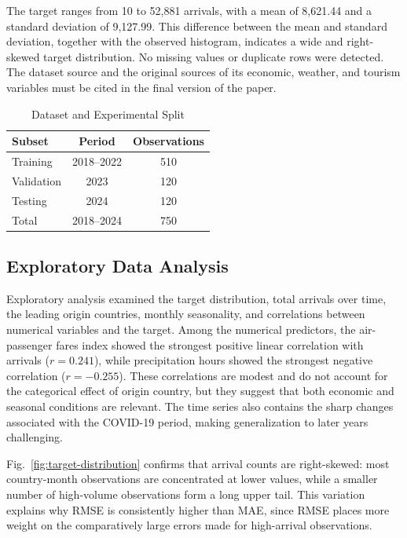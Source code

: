 \documentclass[conference,a4paper]{IEEEtran}
\begin{document}
The target ranges from 10 to 52,881 arrivals, with a mean of 8,621.44 and a standard deviation of 9,127.99. This difference between the mean and standard deviation, together with the observed histogram, indicates a wide and right-skewed target distribution. No missing values or duplicate rows were detected. The dataset source and the original sources of its economic, weather, and tourism variables must be cited in the final version of the paper. %

\begin{table}[htbp]
\caption{Dataset and Experimental Split}
\label{tab:dataset-split}
\centering
\begin{tabular}{lcc}
\toprule
\textbf{Subset} & \textbf{Period} & \textbf{Observations} \\
\midrule
Training & 2018--2022 & 510 \\
Validation & 2023 & 120 \\
Testing & 2024 & 120 \\
\midrule
Total & 2018--2024 & 750 \\
\bottomrule
\end{tabular}
\end{table}

\subsection{Exploratory Data Analysis}
Exploratory analysis \cite{tukey1977eda} examined the target distribution, total arrivals over time, the leading origin countries, monthly seasonality, and correlations between numerical variables and the target. Among the numerical predictors, the air-passenger fares index showed the strongest positive linear correlation with arrivals ($r=0.241$), while precipitation hours showed the strongest negative correlation ($r=-0.255$). These correlations are modest and do not account for the categorical effect of origin country, but they suggest that both economic and seasonal conditions are relevant. The time series also contains the sharp changes associated with the COVID-19 period, making generalization to later years challenging.

Fig.~\ref{fig:target-distribution} confirms that arrival counts are right-skewed: most country-month observations are concentrated at lower values, while a smaller number of high-volume observations form a long upper tail. This variation explains why RMSE is consistently higher than MAE, since RMSE places more weight on the comparatively large errors made for high-arrival observations.
\end{document}

